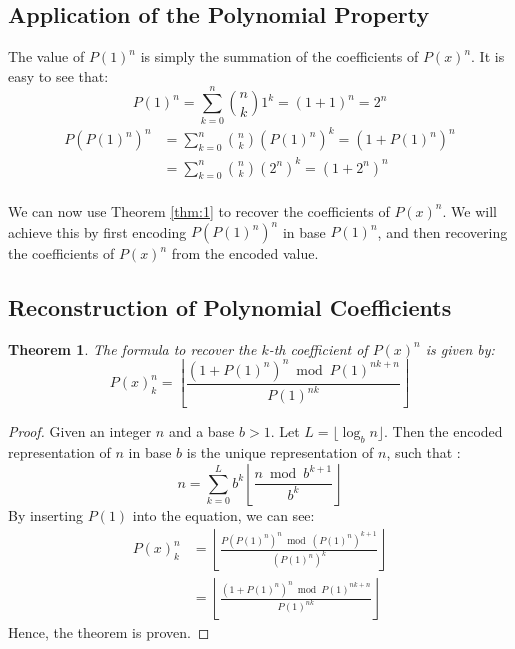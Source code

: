 \documentclass{article}
\theoremstyle{plain}
\newtheorem{thm}{Theorem}
\begin{document}
\subsection{Application of the Polynomial Property}
The value of $P(1)^{n}$ is simply the summation of the coefficients of $P(x)^{n}$. It is easy to see that:
\begin{equation}
P(1)^{n} = \sum_{k=0}^{n} \binom{n}{k} 1^{k} = (1 + 1)^{n} = 2^{n}
\end{equation}
\begin{align}
P(P(1)^{n})^{n} &= \sum_{k=0}^{n} \binom{n}{k} (P(1)^{n})^{k} = (1 + P(1)^{n})^{n} \\
&= \sum_{k=0}^{n} \binom{n}{k} (2^{n})^{k} = (1 + 2^{n})^{n}
\end{align}
\\
We can now use Theorem \ref{thm:1} to recover the coefficients of $P(x)^{n}$. We will achieve this by first encoding $P(P(1)^{n})^{n}$ in base $P(1)^{n}$, and then recovering the coefficients of $P(x)^n$ from the encoded value.

\subsection{Reconstruction of Polynomial Coefficients}

\begin{thm}
\label{thm:3}
The formula to recover the $k$-th coefficient of $P(x)^{n}$ is given by:
\begin{equation}
P(x)^{n}_{k} = \left\lfloor\frac{(1 + P(1)^{n})^{n} \bmod P(1)^{n k + n}}{P(1)^{n k}}\right\rfloor
\end{equation}
\end{thm}

\begin{proof}
Given an integer $n$ and a base $b > 1$. Let $L = \lfloor \log_b{n} \rfloor$. Then the encoded representation of $n$ in base $b$ is the unique representation of $n$, such that \cite{cormen2009introduction}:
\begin{equation}
n = \sum_{k=0}^{L} b^{k} \left\lfloor\frac{n \bmod b^{k+1}}{b^{k}}\right\rfloor 
\end{equation}
By inserting $P(1)$ into the equation, we can see:
\begin{align}
    P(x)^{n}_{k} &= \left\lfloor\frac{P(P(1)^{n})^{n} \bmod (P(1)^{n})^{k+1}}{(P(1)^{n})^{k}}\right\rfloor \\
    &= \left\lfloor\frac{(1 + P(1)^{n})^{n} \bmod P(1)^{n k + n}}{P(1)^{n k}}\right\rfloor
\end{align}
Hence, the theorem is proven.
\end{proof}
\end{document}
